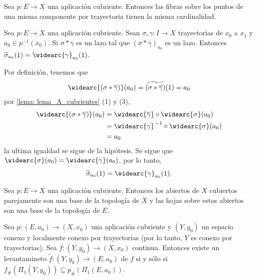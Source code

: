 \begin{coro}
    Sea $p:E\to X$ una aplicación cubriente. Entonces las fibras sobre los puntos de una misma componente por trayectoria tienen la misma cardinalidad.
\end{coro}
\begin{lema}
    \label{lema:lema_B_levantamiento}
    Sea $p:E\to X$ una aplicación cubriente. Sean $\sigma,\gamma:I\to X$ trayectorias de $x_0$ a $x_1$ y $a_0\in p^{-1}(x_0)$. Si $\sigma*\overline{\gamma}$ es un lazo tal que $(\sigma*\overline{\gamma})_{a_0}$ es un lazo. Entonces $\widetilde{\sigma}_{a_0}(1)=\widearc{\gamma}_{a_0}(1).$
\end{lema}
\begin{dem}
    Por definición, tenemos que
    \begin{align*}
        \widearc{(\sigma*\overline{\gamma})}(a_0)=\widetilde{(\sigma*\overline{\gamma})}(1)=a_0
    \end{align*}
    por \ref{lema: lema_A_cubrientes} (1) y (3),
    \begin{align*}
        \widearc{(\sigma*\overline{\gamma})}(a_0)&=\widearc{\overline{\gamma}}\circ\widearc{\sigma}(a_0)\\
        &=\widearc{{\gamma}}^{\hspace{0.5mm}-1}\circ\widearc{\sigma}(a_0)\\
        &=a_0
    \end{align*}
    la ultima igualdad se sigue de la hipótesis. Se sigue que $\widearc{\sigma}(a_0)=\widearc{{\gamma}}(a_0)$, por lo tanto, 
    $$\widetilde{\sigma}_{a_0}(1)=\widearc{\gamma}_{a_0}(1).$$
\end{dem}
\begin{ejercicio}
    Sea $p:E\to X$ una aplicación cubriente. Entonces los abiertos de $X$ cubiertos parejamente son una base de la topología de $X$ y las hojas sobre estos abiertos son una base de la topología de $E$.
\end{ejercicio}
\begin{teorema}[de levantamiento]
\label{teo:teo_levantamiento}
    Sea $p:(E,a_0)\to (X,x_0)$ una aplicación cubriente y $(Y,y_0)$ un espacio conexo y localmente conexo por trayectorias (por lo tanto, $Y$ es conexo por trayectorias). Sea $f:(Y,y_0)\to(X,x_0)$ continua. Entonces existe un levantamineto $\tilde{f}:(Y,y_0)\to (E,a_0)$ de $f$ si y sólo si $f_\#(\Pi_1(Y,y_0))\subseteq p_\#(\Pi_1(E,a_0)).$
\end{teorema}
